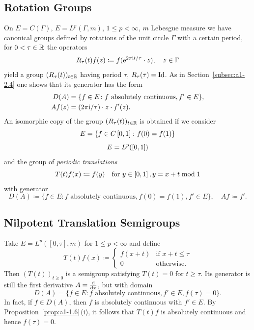\subsection{Rotation Groups}\label{subsec:a1-2.5}%
On $E = C(\Gamma)$, \resp $E = L^{p}(\Gamma,m)$, $1 \leq p < \infty$, $m$ Lebesgue measure we have canonical groups defined by rotations of the unit circle $\Gamma$ with a certain period, \ie for $0 < \tau \in \mathbb{R}$ the operators
\[
    R_{\tau}(t)f(z) \coloneq f( \mathrm{e}^{2\pi \mathrm{i} t/\tau}\cdot z), \quad z \in \Gamma
\]
yield a group $(R_{\tau}(t))_{t \in \mathbb{R}}$ having period $\tau$, \ie $R_{\tau}(\tau) = \operatorname{Id}$.
As in Section~\ref{subsec:a1-2.4} one shows that its generator has the form
\begin{align*}
    D(A) &= \{f \in E \colon f \text{ absolutely continuous}, f' \in E\}, \\
    Af(z)&= (2\pi \mathrm{i}/\tau) \cdot z \cdot f'(z).
\end{align*}
An isomorphic copy of the group $(R_{\tau}(t))_{t \in \mathbb{R}}$ is obtained if we consider 
\[
E = \{f \in C\left[ 0,1 \right] \colon f(0) = f(1)\}
\]
\resp 
\[
E = L^{p}(\left[ 0,1 \right])
\]
and the group of \emph{periodic translations}
\[
    T(t)f(x) \coloneq f(y) \quad \text{for $y \in \left[ 0,1 \right], y = x+t \bmod 1$} 
\]
with generator
\[
    D(A) \coloneq \{f \in E \colon f \text{ absolutely continuous}, f(0) = f(1), f' \in E\}, \quad Af \coloneq f' .
\]
\subsection{Nilpotent Translation Semigroups}\label{subsec:a1-2.6}%
Take $E = L^{p}([0,\tau],m)$ for $1 \leq p < \infty$ and define
\[
    T(t)f(x) \coloneq \begin{cases}
        f(x+t) & \text{if } x+t \leq \tau \\
        0 & \text{otherwise.}
    \end{cases}
\]
Then $(T(t))_{t\geq 0}$ is a semigroup satisfying $T(t) = 0$ for $t \geq \tau$.
Its generator is still the first derivative $A = \frac{\mathop{}\!\mathrm{d}{}}{\mathop{}\!\mathrm{d}{x}}$, but with domain 
\[
D(A) = \{f \in E \colon f \text{ absolutely continuous}, f' \in E, f(\tau) = 0\}.
\]
In fact, if\/ $f \in D(A)$, then $f$ is absolutely continuous with $f' \in E$.
By Proposition~\ref{prop:a1-1.6}\,(i), it follows that $T(t)f$ is absolutely continuous and hence $f(\tau) = 0$.
